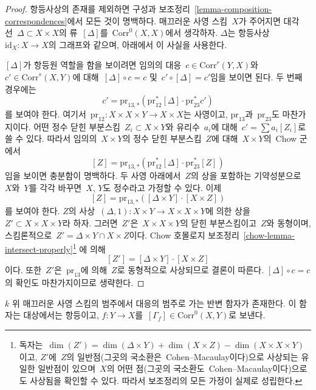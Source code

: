 \begin{proof}
항등사상의 존재를 제외하면 구성과 보조정리\ 
\ref{lemma-composition-correspondences}에서 모든 것이 명백하다.
매끄러운 사영 스킴\  $X$가 주어지면 대각선\ 
$\Delta \subset X \times X$의 류\  $[\Delta]$를\ 
$\text{Corr}^0(X, X)$에서 생각하자. $\Delta$는 항등사상\ 
$\text{id}_X : X \to X$의 그래프와 같으며, 아래에서 이 사실을
사용한다.

\medskip\noindent
$[\Delta]$가 항등원 역할을 함을 보이려면 임의의 대응\ 
$c \in \text{Corr}^r(Y, X)$와\ 
$c' \in \text{Corr}^s(X, Y)$에 대해\ 
$[\Delta] \circ c = c$ 및\  $c' \circ [\Delta] = c'$임을 보이면 된다.
두 번째 경우에는
$$
c' = \text{pr}_{13, *}(\text{pr}_{12}^*[\Delta] \cdot \text{pr}_{23}^*c')
$$
를 보여야 한다. 여기서\ 
$\text{pr}_{12} : X \times X \times Y \to X \times X$는 사영이고,
$\text{pr}_{13}$과\  $\text{pr}_{23}$도 마찬가지이다.
어떤 정수 닫힌 부분스킴\  $Z_i \subset X \times Y$와 유리수\  $a_i$에
대해\  $c' = \sum a_i [Z_i]$로 쓸 수 있다. 따라서 임의의\ 
$X \times Y$의 정수 닫힌 부분스킴\  $Z$에 대해\  $X \times Y$의\  Chow 군에서
$$
[Z] = \text{pr}_{13, *}(\text{pr}_{12}^*[\Delta] \cdot \text{pr}_{23}^*[Z])
$$
임을 보이면 충분함이 명백하다. 두 사영 아래에서\  $Z$의 상을 포함하는
기약성분으로\  $X$와\  $Y$를 각각 바꾸면\  $X$, $Y$도 정수라고 가정할 수
있다. 이제
$$
[Z] = \text{pr}_{13, *}([\Delta \times Y] \cdot [X \times Z])
$$
를 보여야 한다. $Z$의 사상\ 
$(\Delta, 1) : X \times Y \to X \times X \times Y$에 의한 상을\ 
$Z' \subset X \times X \times Y$라 하자. 그러면\  $Z'$은\ 
$X \times X \times Y$의 닫힌 부분스킴이고\  $Z$와 동형이며,
스킴론적으로\  $Z' = \Delta \times Y \cap X \times Z$이다.
Chow 호몰로지 보조정리\  \ref{chow-lemma-intersect-properly}\footnote{
독자는\  $\dim(Z') = \dim(\Delta \times Y) + \dim(X \times Z) -
\dim(X \times X \times Y)$이고, $Z'$에\  $Z$의 일반점(그곳의
국소환은\  Cohen--Macaulay이다)으로 사상되는 유일한 일반점이 있으며\ 
$X$의 어떤 점(그곳의 국소환도\  Cohen--Macaulay이다)으로도 사상됨을
확인할 수 있다. 따라서 보조정리의 모든 가정이 실제로 성립한다.}
에 의해
$$
[Z'] = [\Delta \times Y] \cdot [X \times Z]
$$
이다. 또한\  $Z'$은\  $\text{pr}_{13}$에 의해\  $Z$로 동형적으로
사상되므로 결론이 따른다. $[\Delta] \circ c = c$의 확인도
마찬가지이므로 생략한다.
\end{proof}

\begin{lemma}
\label{lemma-contravariant-functor}
$k$ 위 매끄러운 사영 스킴의 범주에서 대응의 범주로 가는 반변 함자가
존재한다. 이 함자는 대상에서는 항등이고, $f : Y \to X$를\ 
$[\Gamma_f] \in \text{Corr}^0(X, Y)$로 보낸다.
\end{lemma}


